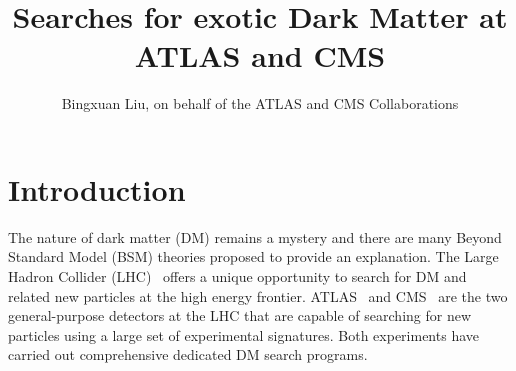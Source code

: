 \documentclass{moriond}
\begin{document}
\vspace*{0cm}
\title{Searches for exotic Dark Matter at ATLAS and CMS}


\author{Bingxuan Liu, on behalf of the ATLAS and CMS Collaborations}

\address{Department of Physics, Simon Fraser University, Vancouver, Canada}

\maketitle{}

\section{Introduction}

The nature of dark matter (DM) remains a mystery and there are many Beyond Standard Model
(BSM) theories proposed to provide an explanation. The Large Hadron Collider (LHC)~\cite{LHCRef} offers a
unique opportunity to search for DM and related new particles at
the high energy frontier. ATLAS~\cite{ATLASRef} and CMS~\cite{CMSRef} are the
two general-purpose detectors at the LHC that are capable of searching for new
particles using a large set of experimental signatures. Both experiments have carried out
comprehensive dedicated DM search programs.

\end{document}
